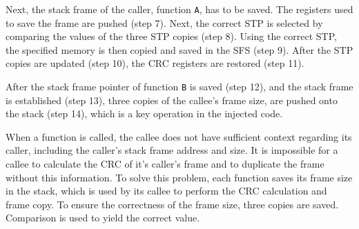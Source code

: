 Next, the stack frame of the caller, function \texttt{A}, has to be saved. The registers used to save the frame are pushed (step 7). Next, the correct STP is selected by comparing the values of the three STP copies (step 8). Using the correct STP, the specified memory is then copied and saved in the SFS (step 9). After the STP copies are updated (step 10), the CRC registers are restored (step 11).

After the stack frame pointer of function \texttt{B} is saved (step 12), and the stack frame is established (step 13), three copies of the callee's frame size, are pushed onto the stack (step 14), which is a key operation in the injected code. 

When a function is called, the callee does not have sufficient context regarding its caller, including the caller's stack frame address and size. It is impossible for a callee to calculate the CRC of it's caller's frame and to duplicate the frame without this information. To solve this problem, each function saves its frame size in the stack, which is used by its callee to perform the CRC calculation and frame copy. To ensure the correctness of the frame size, three copies are saved. Comparison is used to yield the correct value. 

